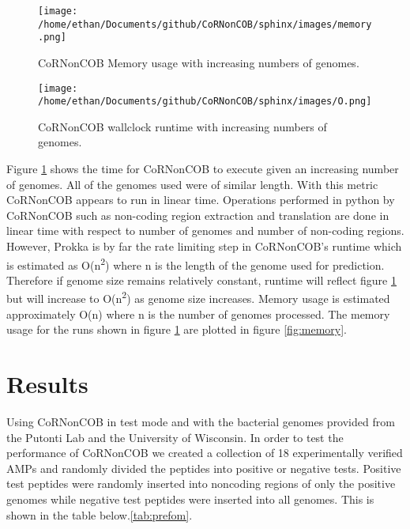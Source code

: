 \documentclass{article}
\begin{document}
\begin{figure}[H]
  \centering
  \begin{minipage}[b]{0.45\textwidth}
    \texttt{[image: /home/ethan/Documents/github/CoRNonCOB/sphinx/images/memory.png]}
    \caption{CoRNonCOB Memory usage with increasing numbers of genomes.}
    \label{fig:memory}
  \end{minipage}
  \hfill
  \begin{minipage}[b]{0.4\textwidth}
    \texttt{[image: /home/ethan/Documents/github/CoRNonCOB/sphinx/images/O.png]}
    \caption{CoRNonCOB wallclock runtime with increasing numbers of genomes.}
    \label{fig:runtime}
  \end{minipage}
\end{figure}

Figure \ref{fig:runtime} shows the time for CoRNonCOB to execute given an increasing number of genomes. All of the genomes used were of similar length. With this metric CoRNonCOB appears to run in linear time. Operations performed in python by CoRNonCOB such as non-coding region extraction and translation are done in linear time with respect to number of genomes and number of non-coding regions. 
\\


However, Prokka is by far the rate limiting step in CoRNonCOB’s runtime which is estimated as O(n\textsuperscript{2}) where n is the length of the genome used for prediction. Therefore if genome size remains relatively constant, runtime will reflect figure \ref{fig:runtime} but will increase to O(n\textsuperscript{2}) as genome size increases. Memory usage is estimated approximately O(n) where n is the number of genomes processed. The memory usage for the runs shown in figure \ref{fig:runtime} are plotted in figure \ref{fig:memory}.


\section{Results} 

Using CoRNonCOB in test mode and with the bacterial genomes provided from the Putonti Lab and the University of Wisconsin. In order to test the performance of CoRNonCOB we created a collection of 18 experimentally verified AMPs and randomly divided the peptides into positive or negative tests. Positive test peptides were randomly inserted into noncoding regions of only the positive genomes while negative test peptides were inserted into all genomes. This is shown in the table below.\ref{tab:prefom}.
\end{document}
